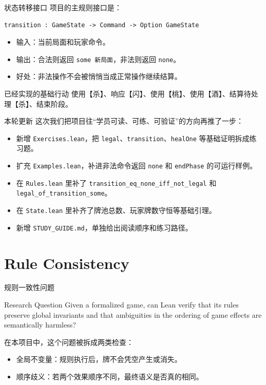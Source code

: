 \documentclass[UTF8,aspectratio=169]{ctexbeamer}
\newcommand{\code}[1]{\texttt{#1}}
\begin{document}
\begin{frame}[fragile]{状态转移接口}
  项目的主规则接口是：

  \begin{verbatim}
transition : GameState -> Command -> Option GameState
  \end{verbatim}

  \begin{itemize}
    \item 输入：当前局面和玩家命令。
    \item 输出：合法则返回 \code{some 新局面}，非法则返回 \code{none}。
    \item 好处：非法操作不会被悄悄当成正常操作继续结算。
  \end{itemize}

  \begin{block}{已经实现的基础行动}
    使用【杀】、响应【闪】、使用【桃】、使用【酒】、结算待处理【杀】、结束阶段。
  \end{block}
\end{frame}

\begin{frame}{本轮更新}
  这次我们把项目往“学员可读、可练、可验证”的方向再推了一步：

  \begin{itemize}
    \item 新增 \code{Exercises.lean}，把 \code{legal}、\code{transition}、\code{healOne} 等基础证明拆成练习题。
    \item 扩充 \code{Examples.lean}，补进非法命令返回 \code{none} 和 \code{endPhase} 的可运行样例。
    \item 在 \code{Rules.lean} 里补了 \code{transition\_eq\_none\_iff\_not\_legal} 和 \code{legal\_of\_transition\_some}。
    \item 在 \code{State.lean} 里补齐了牌池总数、玩家牌数守恒等基础引理。
    \item 新增 \code{STUDY\_GUIDE.md}，单独给出阅读顺序和练习路径。
  \end{itemize}
\end{frame}

\section{Rule Consistency}

\begin{frame}{规则一致性问题}
  \begin{block}{Research Question}
    Given a formalized game, can Lean verify that its rules preserve global
    invariants and that ambiguities in the ordering of game effects are
    semantically harmless?
  \end{block}

  在本项目中，这个问题被拆成两类检查：

  \begin{itemize}
    \item 全局不变量：规则执行后，牌不会凭空产生或消失。
    \item 顺序歧义：若两个效果顺序不同，最终语义是否真的相同。
  \end{itemize}
\end{frame}
\end{document}
